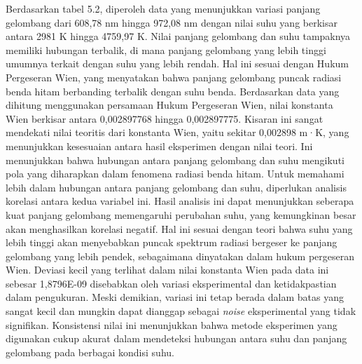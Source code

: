 Berdasarkan tabel 5.2, diperoleh data yang menunjukkan variasi panjang gelombang dari 608,78 nm hingga 972,08 nm dengan nilai suhu yang berkisar antara 2981 K hingga 4759,97 K. Nilai panjang gelombang dan suhu tampaknya memiliki hubungan terbalik, di mana panjang gelombang yang lebih tinggi umumnya terkait dengan suhu yang lebih rendah. Hal ini sesuai dengan Hukum Pergeseran Wien, yang menyatakan bahwa panjang gelombang puncak radiasi benda hitam berbanding terbalik dengan suhu benda. Berdasarkan data yang dihitung menggunakan persamaan Hukum Pergeseran Wien, nilai konstanta Wien berkisar antara 0,002897768 hingga 0,002897775. Kisaran ini sangat mendekati nilai teoritis dari konstanta Wien, yaitu sekitar 0,002898 m·K, yang menunjukkan kesesuaian antara hasil eksperimen dengan nilai teori. Ini menunjukkan bahwa hubungan antara panjang gelombang dan suhu mengikuti pola yang diharapkan dalam fenomena radiasi benda hitam. Untuk memahami lebih dalam hubungan antara panjang gelombang dan suhu, diperlukan analisis korelasi antara kedua variabel ini. Hasil analisis ini dapat menunjukkan seberapa kuat panjang gelombang memengaruhi perubahan suhu, yang kemungkinan besar akan menghasilkan korelasi negatif. Hal ini sesuai dengan teori bahwa suhu yang lebih tinggi akan menyebabkan puncak spektrum radiasi bergeser ke panjang gelombang yang lebih pendek, sebagaimana dinyatakan dalam hukum pergeseran Wien. Deviasi kecil yang terlihat dalam nilai konstanta Wien pada data ini sebesar 1,8796E-09 disebabkan oleh variasi eksperimental dan ketidakpastian dalam pengukuran. Meski demikian, variasi ini tetap berada dalam batas yang sangat kecil dan mungkin dapat dianggap sebagai \textit{noise} eksperimental yang tidak signifikan. Konsistensi nilai ini menunjukkan bahwa metode eksperimen yang digunakan cukup akurat dalam mendeteksi hubungan antara suhu dan panjang gelombang pada berbagai kondisi suhu.


